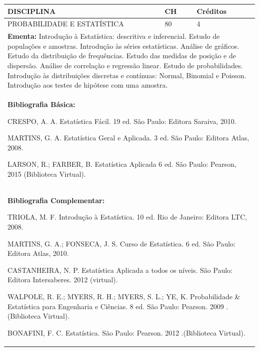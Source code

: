 \documentclass[a4paper, 12pt, openright, oneside, german, french, english, brazil]{abntex2}
\begin{document}
\begin{table}[!h]
  \footnotesize
  \centering
  \begin{tabular}{|p{100mm}|p{10mm}|p{20mm}|}
    \hline
    \textbf{DISCIPLINA} & \textbf{CH} & \textbf{Créditos} \\
    \hline
    PROBABILIDADE E ESTATÍSTICA  & 80 & 4 \\
    \hline
    \multicolumn{3}{|p{130mm}|}{\textbf{Ementa:} Introdução à Estatística: descritiva e inferencial. Estudo de populações e amostras. Introdução às séries estatísticas. Análise de gráficos. Estudo da distribuição de frequências. Estudo das medidas de posição e de dispersão. Análise de correlação e regressão linear. Estudo de probabilidades. Introdução às distribuições discretas e contínuas: Normal, Binomial e Poisson. Introdução aos testes de hipótese com uma amostra.} \\
    \hline
    \multicolumn{3}{|p{130mm}|}{\textbf{Bibliografia Básica:}

    CRESPO, A. A. Estatística Fácil. 19 ed. São Paulo: Editora Saraiva, 2010.

MARTINS, G. A. Estatística Geral e Aplicada. 3 ed. São Paulo: Editora Atlas, 2008.

LARSON, R.; FARBER, B. Estatística Aplicada 6 ed. São Paulo: Pearson, 2015
(Biblioteca Virtual).
} \\
    \hline
    \multicolumn{3}{|p{130mm}|}{\textbf{Bibliografia Complementar:}

    TRIOLA, M. F. Introdução à Estatística. 10 ed. Rio de Janeiro: Editora LTC, 2008.

MARTINS, G. A.; FONSECA, J. S. Curso de Estatística. 6 ed. São Paulo: Editora Atlas, 2010.

CASTANHEIRA, N. P. Estatística Aplicada a todos os níveis. São Paulo: Editora Intersaberes. 2012 (virtual).

WALPOLE, R. E.; MYERS, R. H.; MYERS, S. L.; YE, K. Probabilidade \& Estatística para Engenharia e Ciências. 8 ed. São Paulo: Pearson. 2009 .(Biblioteca Virtual).

BONAFINI, F. C. Estatística. São Paulo: Pearson. 2012 .(Biblioteca Virtual).
} \\
    \hline
  \end{tabular}
\end{table}
\end{document}

